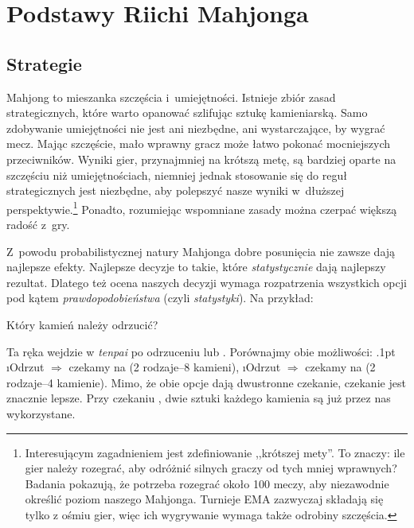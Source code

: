 \chapter{Podstawy Riichi Mahjonga}\label{ch:basic}
\thispagestyle{empty}

\section{Strategie}

Mahjong to mieszanka szczęścia i~umiejętności.
Istnieje zbiór zasad strategicznych, które warto opanować szlifując sztukę kamieniarską.
Samo zdobywanie umiejętności nie jest ani niezbędne, ani wystarczające, by wygrać mecz.
Mając szczęście, mało wprawny gracz może łatwo pokonać mocniejszych przeciwników.
Wyniki gier, przynajmniej na krótszą metę, są bardziej oparte na szczęściu niż umiejętnościach, niemniej jednak stosowanie się do reguł strategicznych jest niezbędne, aby polepszyć nasze wyniki w~dłuższej perspektywie.\footnote{Interesującym zagadnieniem jest zdefiniowanie ,,krótszej mety''. To znaczy: ile gier należy rozegrać, aby odróżnić silnych graczy od tych mniej wprawnych? Badania pokazują, że potrzeba rozegrać około 100 meczy, aby niezawodnie określić poziom naszego Mahjonga. Turnieje EMA zazwyczaj składają się tylko z ośmiu gier, więc ich wygrywanie wymaga także odrobiny szczęścia.}
Ponadto, rozumiejąc wspomniane zasady można czerpać większą radość z~gry.

\bigskip
Z~powodu probabilistycznej natury Mahjonga dobre posunięcia nie zawsze dają najlepsze efekty.
Najlepsze decyzje to takie, które \emph{statystycznie} dają najlepszy rezultat.
Dlatego też ocena naszych decyzji wymaga rozpatrzenia wszystkich opcji pod kątem \emph{prawdopodobieństwa} (czyli \emph{statystyki}).
Na przykład:
\vspace{5pt}
\begin{screen}
\vspace{-10pt}Który kamień należy odrzucić? \vspace{-5pt}
\end{screen}

\pagebreak
\noindent
Ta ręka wejdzie w \emph{tenpai} po odrzuceniu  lub .
Porównajmy obie możliwości:
\bi\itemsep.1pt
\i Odrzut  \hspace{5pt} $\Rightarrow$ czekamy na  (2 rodzaje--8 kamieni),
\i Odrzut  \hspace{5pt} $\Rightarrow$ czekamy na  (2 rodzaje--4 kamienie).
\ei
Mimo, że obie opcje dają dwustronne czekanie, czekanie  jest znacznie lepsze.
Przy czekaniu , dwie sztuki każdego kamienia są już przez nas wykorzystane.


